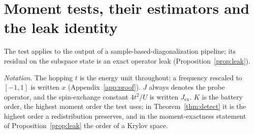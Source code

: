 \documentclass[submission, PhysCore]{SciPost}
\begin{document}
\section{Moment tests, their estimators and the leak identity}
\label{sec:method}
\label{sec:role}
The test applies to the output of a sample-based-diagonalization pipeline; its residual on the subspace state is an exact operator leak (Proposition~\ref{prop:leak}).

\emph{Notation.} The hopping $t$ is the energy unit throughout; a frequency rescaled to $[-1,1]$ is written $x$ (Appendix~\ref{app:proof}). $J$ always denotes the probe operator, and the spin-exchange constant $4t^2/U$ is written $J_{\mathrm{ex}}$. $K$ is the battery order, the highest moment order the test uses; in Theorem~\ref{thm:detect} it is the highest order a redistribution preserves, and in the moment-exactness statement of Proposition~\ref{prop:leak} the order of a Krylov space.
\end{document}

